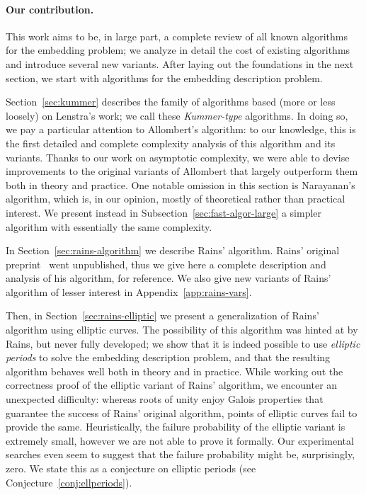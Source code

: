 \documentclass{mcom-l}
\theoremstyle{plain}
\theoremstyle{definition}
\newcounter{algorithm}
\begin{document}
\paragraph{\bf Our contribution.}
This work aims to be, in large part, a complete review of all known
algorithms for the embedding problem; we analyze in detail the cost of 
existing algorithms and introduce several new variants. %
After laying out the foundations in the next section, we start with
algorithms for the embedding description problem. %

Section~\ref{sec:kummer} describes the family of algorithms based
(more or less loosely) on Lenstra's work; we call these
\emph{Kummer-type} algorithms. %
In doing so, we pay a particular attention to Allombert's algorithm:
to our knowledge, this is the first detailed and complete complexity
analysis of this algorithm and its variants. %
Thanks to our work on asymptotic complexity, we were able to devise
improvements to the original variants of Allombert that largely
outperform them both in theory and practice. %
One notable omission in this section is Narayanan's algorithm, which
is, in our opinion, mostly of theoretical rather than practical
interest. %
We present instead in Subsection~\ref{sec:fast-algor-large} a simpler
algorithm with essentially the same complexity.

In Section~\ref{sec:rains-algorithm} we describe Rains' algorithm. %
Rains' original preprint~\cite{rains2008} went unpublished, thus we
give here a complete description and analysis of his algorithm, for
reference. %
We also give new variants of Rains' algorithm of lesser
interest in Appendix~\ref{app:rains-vars}.

Then, in Section~\ref{sec:rains-elliptic} we present a generalization
of Rains' algorithm using elliptic curves. %
The possibility of this algorithm was hinted at by Rains, but never
fully developed; we show that it is indeed possible to use
\emph{elliptic periods} to solve the embedding description problem,
and that the resulting algorithm behaves well both in theory and in
practice. %
While working out the correctness proof of the elliptic variant of
Rains' algorithm, we encounter an unexpected difficulty: whereas roots
of unity enjoy Galois properties that guarantee the success of Rains'
original algorithm, points of elliptic curves fail to provide the
same. %
Heuristically, the failure probability of the elliptic variant is
extremely small, however we are not able to prove it formally. %
Our experimental searches even seem to suggest that the failure
probability might be, surprisingly, zero. %
We state this as a conjecture on elliptic periods (see
Conjecture~\ref{conj:ellperiods}).
\end{document}
